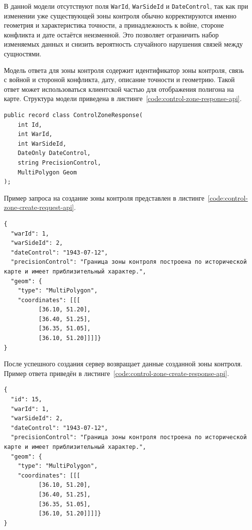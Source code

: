 В данной модели отсутствуют поля \texttt{WarId}, \texttt{WarSideId} и \texttt{DateControl}, так как при изменении уже существующей зоны контроля обычно корректируются именно геометрия и характеристика точности, а принадлежность к войне, стороне конфликта и дате остаётся неизменной. Это позволяет ограничить набор изменяемых данных и снизить вероятность случайного нарушения связей между сущностями.

Модель ответа для зоны контроля содержит идентификатор зоны контроля, связь с войной и стороной конфликта, дату, описание точности и геометрию. Такой ответ может использоваться клиентской частью для отображения полигона на карте. Структура модели приведена в листинге~\ref{code:control-zone-response-api}.

\begin{code}
\label{code:control-zone-response-api}
\vspace{-0.75cm}
\begin{verbatim}
public record class ControlZoneResponse(
    int Id,
    int WarId,
    int WarSideId,
    DateOnly DateControl,
    string PrecisionControl,
    MultiPolygon Geom
);
\end{verbatim}
\end{code}

Пример запроса на создание зоны контроля представлен в листинге~\ref{code:control-zone-create-request-api}.

\begin{code}
\label{code:control-zone-create-request-api}
\vspace{-0.75cm}
\begin{verbatim}
{
  "warId": 1,
  "warSideId": 2,
  "dateControl": "1943-07-12",
  "precisionControl": "Граница зоны контроля построена по исторической карте и имеет приблизительный характер.",
  "geom": {
    "type": "MultiPolygon",
    "coordinates": [[[
          [36.10, 51.20],
          [36.40, 51.25],
          [36.35, 51.05],
          [36.10, 51.20]]]]}
}
\end{verbatim}
\end{code}

После успешного создания сервер возвращает данные созданной зоны контроля. Пример ответа приведён в листинге~\ref{code:control-zone-create-response-api}.

\begin{code}
\label{code:control-zone-create-response-api}
\vspace{-0.75cm}
\begin{verbatim}
{
  "id": 15,
  "warId": 1,
  "warSideId": 2,
  "dateControl": "1943-07-12",
  "precisionControl": "Граница зоны контроля построена по исторической карте и имеет приблизительный характер.",
  "geom": {
    "type": "MultiPolygon",
    "coordinates": [[[
          [36.10, 51.20],
          [36.40, 51.25],
          [36.35, 51.05],
          [36.10, 51.20]]]]}
}
\end{verbatim}
\end{code}

